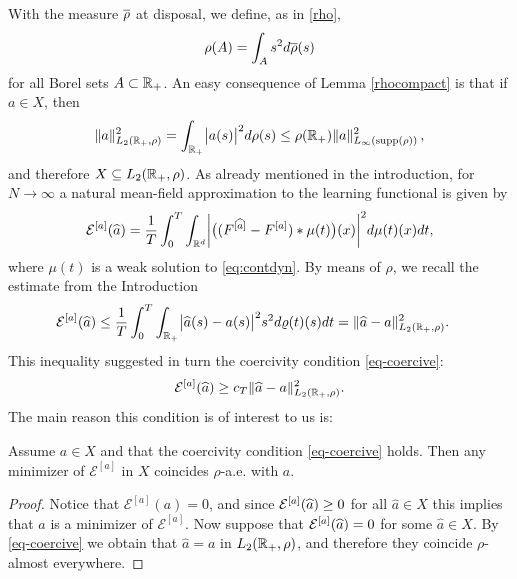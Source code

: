 With the measure $\overline\rho$ at disposal, we define, as in \eqref{rho},  $$\rho(A) = \int_{A} s^2 d\overline\rho(s)$$ for all Borel sets $A \subset \mathbb{R}_+$.  An easy consequence of Lemma \ref{rhocompact} is that if $a\in X$, then
\begin{align}\label{eq:inftyimplyl2}
\|a\|^2_{L_2(\mathbb{R}_+,\rho)} = \int_{\mathbb{R}_+} \bigl|a(s)\bigr|^2 d\rho(s) \leq \rho(\mathbb R_+)\|a\|^2_{L_{\infty}(\operatorname{supp}(\rho))}\,,
\end{align}
and therefore $X\subseteq L_2(\mathbb{R}_+,\rho)$.  
As already mentioned in the introduction, for $N \to \infty$ a natural mean-field approximation to the learning functional is given by
\begin{align*}
	\mathcal E^{[a]}(\widehat a)=\frac{1}{T}\int_0^T \int_{\mathbb{R}^d} \biggl|\bigl((F^{[\widehat a]}-F^{[a]})\ast\mu(t)\bigr)(x)\biggr|^2d\mu(t)(x)dt,
\end{align*}
where $\mu(t)$ is a weak solution to \eqref{eq:contdyn}. 
By means of $\rho$, we recall the estimate from the Introduction
\begin{align}
\begin{split}\label{eq-rho-3}
	\mathcal E^{[a]}(\widehat a)&\leq\frac{1}{T}\int_0^T\int_{\mathbb{R}_+}\bigl|\widehat a(s)-a(s)\bigr|^2 s^2 d\varrho(t)(s) dt = \|\widehat a-a\|^2_{L_2(\mathbb{R}_+,\rho)}.
\end{split}
\end{align}
This inequality suggested in turn the coercivity condition \eqref{eq-coercive}: 
\begin{align*}
	\mathcal E^{[a]}(\widehat a)\geq c_T\|\widehat a-a\|^2_{L_2(\mathbb{R}_+,\rho)}.
\end{align*}
The main reason this condition is of interest to us is:

\begin{proposition}\label{uniquemin}
Assume $a \in X$ and that the coercivity condition \eqref{eq-coercive} holds. Then any minimizer of $\mathcal E^{[a]}$ in $X$ coincides $\rho$-a.e. with $a$.
\end{proposition}
\begin{proof}
Notice that $\mathcal E^{[a]}(a)=0$, and since $\mathcal E^{[a]}(\widehat a)\geq 0$ for all $\widehat a\in X$ this implies that $a$ is a minimizer of $\mathcal E^{[a]}$. Now suppose that $ \mathcal E^{[a]}(\widehat a)=0$ for some $\widehat a\in X$. By \eqref{eq-coercive} we obtain that $\widehat a=a$ in $L_2(\mathbb{R}_+,\rho)$, and therefore they coincide $\rho$-almost everywhere. %
\end{proof}


